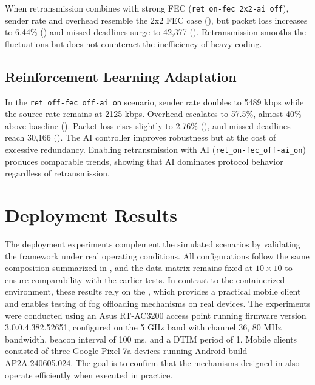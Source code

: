 \quad When retransmission combines with strong FEC (\texttt{ret\_on-fec\_2x2-ai\_off}), sender rate and overhead resemble the 2x2 FEC case (\textbf{}), but packet loss increases to 6.44\% (\textbf{}) and missed deadlines surge to 42,377 (\textbf{}). Retransmission smooths the fluctuations but does not counteract the inefficiency of heavy coding.

\subsection{Reinforcement Learning Adaptation}

\quad In the \texttt{ret\_off-fec\_off-ai\_on} scenario, sender rate doubles to 5489 kbps while the source rate remains at 2125 kbps. Overhead escalates to 57.5\%, almost 40\% above baseline (\textbf{}). Packet loss rises slightly to 2.76\% (\textbf{}), and missed deadlines reach 30,166 (\textbf{}). The AI controller improves robustness but at the cost of excessive redundancy. Enabling retransmission with AI (\texttt{ret\_on-fec\_off-ai\_on}) produces comparable trends, showing that AI dominates protocol behavior regardless of retransmission.  

\section{Deployment Results}
\label{sec:deployment results}

\quad The deployment experiments complement the simulated scenarios by validating the framework under real operating conditions. All configurations follow the same composition summarized in \textbf{}, and the data matrix remains fixed at \(10 \times 10\) to ensure comparability with the earlier tests. In contrast to the containerized environment, these results rely on the \textbf{}, which provides a practical mobile client and enables testing of fog offloading mechanisms on real devices. The experiments were conducted using an Asus RT-AC3200 access point running firmware version 3.0.0.4.382.52651, configured on the 5 GHz band with channel 36, 80 MHz bandwidth, beacon interval of 100 ms, and a DTIM period of 1. Mobile clients consisted of three Google Pixel 7a devices running Android build AP2A.240605.024. The goal is to confirm that the mechanisms designed in \textbf{} also operate efficiently when executed in practice.

